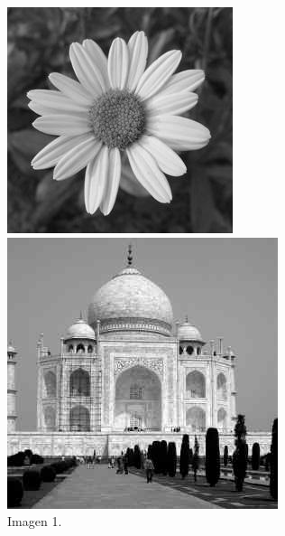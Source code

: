 \documentclass[10pt, a4paper]{article}
\begin{document}
\begin{itemize}
\begin{figure}[!htb]
  \includegraphics[width=\linewidth]{imagen1.jpg}
  \caption{Imagen 1.}\label{fig:awesome_image1}
\endminipage\hfill
{}
  \includegraphics[width=\linewidth]{imagen2.jpg}

\end{figure}
\end{itemize}
\end{document}
